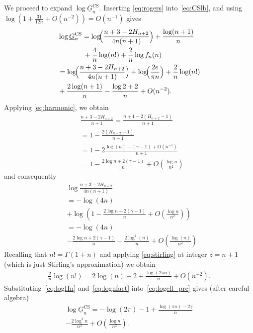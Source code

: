 \documentclass[article,doublecolumn]{IEEEtran}
\begin{document}
\medskip
We proceed to expand $\log \underline{G}^{\mathrm{CS}}_n$.
Inserting \eqref{eq:rogers} into~\eqref{eq:CSlb}, and using
$\log(1+\frac{31}{12n}+O(n^{-2}))=O(n^{-1})$ gives
\begin{align}
&\log \underline{G}^{\mathrm{CS}}_n
= \log\!\Bigl(\frac{n+3-2H_{n+2}}{4n(n+1)}\Bigr)
+\frac{\log(n+1)}{n}\nonumber\\
&~~~~~~~~~~~+\frac{4}{n}\log(n!)
+\frac{2}{n}\log f_n(n)\\
&= \log\!\Bigl(\frac{n+3-2H_{n+2}}{4n(n+1)}\Bigr)
+\log\!\Bigl(\frac{2e}{\pi n}\Bigr)
+\frac{2}{n}\log(n!)\nonumber\\
&+\frac{2\log(n+1)}{n}
-\frac{\log 2+2}{n}
+O(n^{-2}).\label{eq:logell_pre}
\end{align}
Applying \eqref{eq:harmonic}, 
we obtain
\begin{align}
&\frac{n+3-2H_{n+2}}{n+1}
= \frac{n+1-2(H_{n+2}-1)}{n+1}\\
&=1-\frac{2(H_{n+2}-1)}{n+1}\\
&=1-2\frac{\log(n)+(\gamma-1)+O(n^{-1})}{n+1}\\
&=1-\frac{2\log{n}+2(\gamma-1)}{n}+O\left(\frac{\log n}{n^2}\right)
\end{align}
and consequently
\begin{align}
&\log\frac{n+3-2H_{n+2}}{4n(n+1)}\nonumber\\
&= -\log(4n)\nonumber\\
&+\log\left(1-\frac{2\log{n}+2(\gamma-1)}{n}+O\left(\frac{\log n}{n^2}\right) \right)\\
&=-\log(4n)\nonumber\\
&-\frac{2\log{n}+2(\gamma-1)}{n}-\frac{2\log^2(n)}{n}+O\left(\frac{\log(n)}{n^2} \right)
\label{eq:logHn}
\end{align}
Recalling that $n!=\Gamma(1+n)$ and applying \eqref{eq:stirling} at integer $z=n+1$ (which is just Stirling's approximation) we obtain
\begin{align}
\frac{2}{n}\log(n!)=2\log(n)-2+\frac{\log(2\pi n)}{n}+O(n^{-2}).\label{eq:lognfact}   
\end{align}
Substituting~\eqref{eq:logHn} and~\eqref{eq:lognfact} into~\eqref{eq:logell_pre} gives (after careful algebra)
\begin{align}\label{eq:logell}
\log \underline{G}^{\mathrm{CS}}_n= -\log(2\pi)-1+\frac{\log(\pi n)-2\gamma}{n}
\nonumber\\-\frac{2\log^2 n}{n^2}+O\left(\frac{\log n}{n^2}\right).
\end{align}
\end{document}
